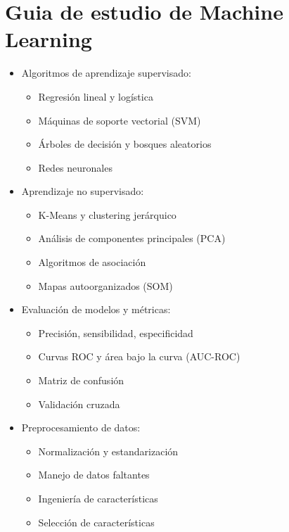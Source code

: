 \documentclass[12pt]{article}
\begin{document}
\newpage


\section{Guia de estudio de Machine Learning}

\begin{itemize}
    \item Algoritmos de aprendizaje supervisado:
        \begin{itemize}
            \item Regresión lineal y logística
            \item Máquinas de soporte vectorial (SVM)
            \item Árboles de decisión y bosques aleatorios
            \item Redes neuronales
        \end{itemize}
    \item Aprendizaje no supervisado:
        \begin{itemize}
            \item K-Means y clustering jerárquico
            \item Análisis de componentes principales (PCA)
            \item Algoritmos de asociación
            \item Mapas autoorganizados (SOM)
        \end{itemize}
    \item Evaluación de modelos y métricas:
        \begin{itemize}
            \item Precisión, sensibilidad, especificidad
            \item Curvas ROC y área bajo la curva (AUC-ROC)
            \item Matriz de confusión
            \item Validación cruzada
        \end{itemize}
    \item Preprocesamiento de datos:
        \begin{itemize}
            \item Normalización y estandarización
            \item Manejo de datos faltantes
            \item Ingeniería de características
            \item Selección de características
        \end{itemize}

\end{itemize}
\end{document}

